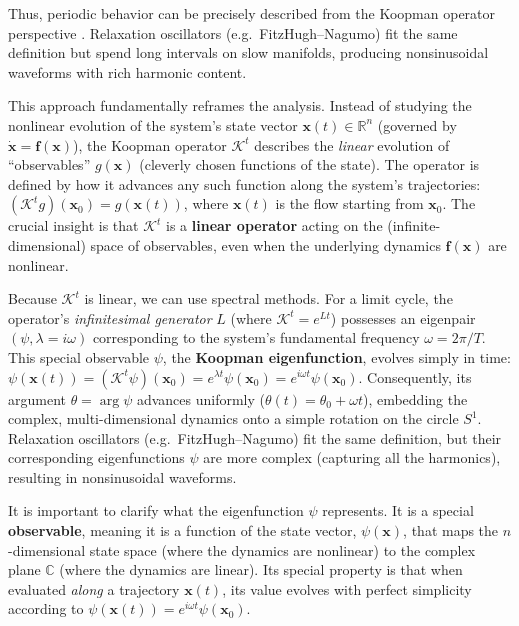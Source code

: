 Thus,  periodic behavior can be precisely described from the  Koopman operator perspective \cite{Koopman31}. Relaxation oscillators (e.g.\ FitzHugh–Nagumo) fit the same definition but spend long intervals on slow manifolds, producing nonsinusoidal waveforms with rich harmonic content.





This approach fundamentally reframes the analysis. Instead of studying the nonlinear evolution of the system's state vector $\mathbf{x}(t) \in \mathbb{R}^n$ (governed by $\dot{\mathbf{x}} = \mathbf{f}(\mathbf{x})$), the Koopman operator $\mathcal{K}^t$ describes the \textit{linear} evolution of   ``observables'' $g(\mathbf{x})$ (cleverly chosen functions of the state). The operator is defined by how it advances any such function along the system's trajectories: $(\mathcal{K}^t g)(\mathbf{x}_0) = g(\mathbf{x}(t))$, where $\mathbf{x}(t)$ is the flow starting from $\mathbf{x}_0$. The crucial insight is that $\mathcal{K}^t$ is a \textbf{linear operator} acting on the (infinite-dimensional) space of observables, even when the underlying dynamics $\mathbf{f}(\mathbf{x})$ are nonlinear.

Because $\mathcal{K}^t$ is linear, we can use spectral methods. For a limit cycle, the operator's \textit{infinitesimal generator} $L$ (where $\mathcal{K}^t = e^{Lt}$) possesses an eigenpair $(\psi, \lambda=i\omega)$ corresponding to the system's fundamental frequency $\omega = 2\pi/T$. This special observable $\psi$, the \textbf{Koopman eigenfunction}, evolves simply in time: $\psi(\mathbf{x}(t)) = (\mathcal{K}^t \psi)(\mathbf{x}_0) = e^{\lambda t} \psi(\mathbf{x}_0) = e^{i\omega t} \psi(\mathbf{x}_0)$. Consequently, its argument $\theta=\arg\psi$ advances uniformly ($\theta(t) = \theta_0 + \omega t$), embedding the complex, multi-dimensional dynamics onto a simple rotation on the circle $S^{1}$. Relaxation oscillators (e.g.\ FitzHugh–Nagumo) fit the same definition, but their corresponding eigenfunctions $\psi$ are more complex (capturing all the harmonics), resulting in nonsinusoidal waveforms.

It is important to clarify what the eigenfunction $\psi$ represents. It is a special \textbf{observable}, meaning it is a function of the state vector, $\psi(\mathbf{x})$, that maps the $n$-dimensional state space (where the dynamics are nonlinear) to the complex plane $\mathbb{C}$ (where the dynamics are linear). Its special property is that when evaluated \textit{along} a trajectory $\mathbf{x}(t)$, its value evolves with perfect simplicity according to $\psi(\mathbf{x}(t)) = e^{i\omega t}\psi(\mathbf{x}_0)$.

